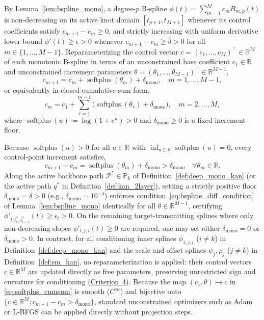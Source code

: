 \documentclass[11pt,a4paper]{article}
\theoremstyle{plain}
\theoremstyle{definition}
\theoremstyle{remark}
\begin{document}
By Lemma~\ref{lem:bspline_mono}, a degree-$p$ B-spline $\phi(t) = \sum_{m=1}^M c_m B_{m, p}(t)$ is non-decreasing on its active knot domain $[t_{p+1}, t_{M+1}]$ whenever its control coefficients satisfy $c_{m+1} - c_m \ge 0$, and strictly increasing with uniform derivative lower bound $\phi'(t) \ge \epsilon > 0$ whenever $c_{m+1} - c_m \ge \delta > 0$ for all $m \in \{1, \dots, M-1\}$. Reparameterizing the control vector $c = (c_1, \dots, c_M)^\top \in \mathbb{R}^M$ of each monotonic B-spline in terms of an unconstrained base coefficient $c_1 \in \mathbb{R}$ and unconstrained increment parameters $\theta = (\theta_1, \dots, \theta_{M-1})^\top \in \mathbb{R}^{M-1}$,
\begin{equation}
    c_{m+1} = c_m + \operatorname{softplus}(\theta_m) + \delta_{\text{mono}}, \quad m = 1, \dots, M-1,
    \label{eq:softplus_reparam}
\end{equation}
or equivalently in closed cumulative-sum form,
\begin{equation}
    c_m = c_1 + \sum_{r=1}^{m-1} \Big( \operatorname{softplus}(\theta_r) + \delta_{\text{mono}} \Big), \quad m = 2, \dots, M,
    \label{eq:softplus_cumsum}
\end{equation}
where $\operatorname{softplus}(u) \coloneqq \log(1 + e^u) > 0$ and $\delta_{\text{mono}} \ge 0$ is a fixed increment floor.

Because $\operatorname{softplus}(u) > 0$ for all $u \in \mathbb{R}$ with $\inf_{u \in \mathbb{R}} \operatorname{softplus}(u) = 0$, every control-point increment satisfies,
\begin{equation}
    c_{m+1} - c_m = \operatorname{softplus}(\theta_m) + \delta_{\text{mono}} > \delta_{\text{mono}} \quad \forall \theta_m \in \mathbb{R}.
\end{equation}
Along the active backbone path $\mathcal{P}^* \in \mathbb{P}_k$ of Definition~\ref{def:deep_mono_kan} (or the active path $q^*$ in Definition~\ref{def:kan_2layer}), setting a strictly positive floor $\delta_{\text{mono}} = \delta > 0$ (e.g., $\delta_{\text{mono}} = 10^{-4}$) enforces condition~\eqref{eq:bspline_diff_condition} of Lemma~\ref{lem:bspline_mono} identically for all $\theta \in \mathbb{R}^{M-1}$, certifying $\phi'_{l, i_l^*, i_{l-1}^*}(t) \ge \epsilon_l > 0$. On the remaining target-transmitting splines where only non-decreasing slopes $\phi'_{l, j, i}(t) \ge 0$ are required, one may set either $\delta_{\text{mono}} = 0$ or $\delta_{\text{mono}} > 0$. In contrast, for all conditioning inner splines $\phi_{1, j, i}$ ($i \neq k$) in Definition~\ref{def:deep_mono_kan} and the scale and offset splines $\psi_j, \rho_j$ ($j \neq k$) in Definition~\ref{def:sm_kan}, no reparameterization is applied: their control vectors $c \in \mathbb{R}^M$ are updated directly as free parameters, preserving unrestricted sign and curvature for conditioning (\hyperref[crit:conditioning_freedom]{Criterion~4}). Because the map $(c_1, \theta) \mapsto c$ in \eqref{eq:softplus_cumsum} is smooth ($C^\infty$) and bijective onto $\{c \in \mathbb{R}^M : c_{m+1} - c_m > \delta_{\text{mono}}\}$, standard unconstrained optimizers such as Adam or L-BFGS can be applied directly without projection steps.
\end{document}
